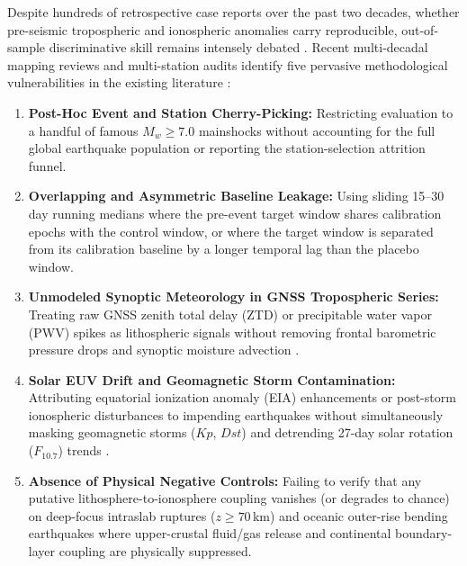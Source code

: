 ﻿\documentclass[journal]{IEEEtran}
\begin{document}
Despite hundreds of retrospective case reports over the past two decades, whether pre-seismic tropospheric and ionospheric anomalies carry reproducible, out-of-sample discriminative skill remains intensely debated \cite{jordan2011,kossobokov2020,chaniadakis2025,diaz2026}. Recent multi-decadal mapping reviews and multi-station audits identify five pervasive methodological vulnerabilities in the existing literature \cite{chaniadakis2025,diaz2026,wen2026}:
\begin{enumerate}
    \item \textbf{Post-Hoc Event and Station Cherry-Picking:} Restricting evaluation to a handful of famous $M_w \ge 7.0$ mainshocks without accounting for the full global earthquake population or reporting the station-selection attrition funnel.
    \item \textbf{Overlapping and Asymmetric Baseline Leakage:} Using sliding 15--30 day running medians where the pre-event target window shares calibration epochs with the control window, or where the target window is separated from its calibration baseline by a longer temporal lag than the placebo window.
    \item \textbf{Unmodeled Synoptic Meteorology in GNSS Tropospheric Series:} Treating raw GNSS zenith total delay (ZTD) or precipitable water vapor (PWV) spikes as lithospheric signals without removing frontal barometric pressure drops and synoptic moisture advection \cite{bevis1992,hersbach2020}.
    \item \textbf{Solar EUV Drift and Geomagnetic Storm Contamination:} Attributing equatorial ionization anomaly (EIA) enhancements or post-storm ionospheric disturbances to impending earthquakes without simultaneously masking geomagnetic storms ($Kp$, $Dst$) and detrending 27-day solar rotation ($F_{10.7}$) trends \cite{wen2026}.
    \item \textbf{Absence of Physical Negative Controls:} Failing to verify that any putative lithosphere-to-ionosphere coupling vanishes (or degrades to chance) on deep-focus intraslab ruptures ($z \ge 70$\,km) and oceanic outer-rise bending earthquakes where upper-crustal fluid/gas release and continental boundary-layer coupling are physically suppressed.
\end{enumerate}
\end{document}
